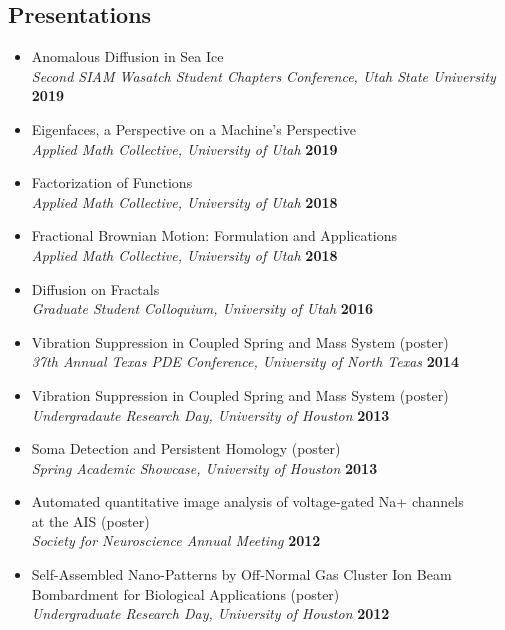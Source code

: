 \documentclass[margin,line]{res}
\begin{document}
\begin{resume}
\section{\sc Presentations}
\begin{itemize}
    \item[] Anomalous Diffusion in Sea Ice
        \\{\it Second SIAM Wasatch Student Chapters Conference, Utah State University} \hfill {\bf 2019} 
    \item[] Eigenfaces, a Perspective on a Machine's Perspective
        \\{\it Applied Math Collective, University of Utah} \hfill {\bf 2019}
    \item[] Factorization of Functions
        \\ {\it Applied Math Collective, University of Utah } \hfill {\bf 2018} 
    \item[] Fractional Brownian Motion: Formulation and Applications
        \\ {\it Applied Math Collective, University of Utah} \hfill {\bf 2018} 
    \item[] Diffusion on Fractals
        \\ {\it Graduate Student Colloquium, University of Utah} \hfill {\bf 2016} 
    \item[] Vibration Suppression in Coupled Spring and Mass System (poster)
        \\ {\it 37th Annual Texas PDE Conference, University of North Texas} \hfill {\bf 2014} 
    \item[] Vibration Suppression in Coupled Spring and Mass System (poster)
        \\ {\it Undergradaute Research Day, University of Houston} \hfill {\bf 2013} 
    \item[] Soma Detection and Persistent Homology (poster) 
    \\ {\it Spring Academic Showcase, University of Houston} \hfill {\bf 2013} 
    \item[] Automated quantitative image analysis of voltage-gated Na+ channels \\ at the AIS (poster) 
    \\ {\it Society for Neuroscience Annual Meeting} \hfill {\bf 2012}
    \item[] Self-Assembled Nano-Patterns by Off-Normal Gas Cluster  Ion Beam \\ Bombardment for Biological Applications (poster) 
    \\ {\it Undergraduate Research Day, University of Houston} \hfill {\bf 2012} 
\end{itemize}


\end{resume}
\end{document}
